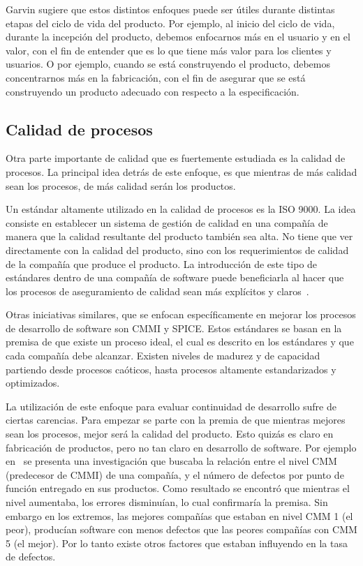 Garvin sugiere que estos distintos enfoques puede ser útiles durante distintas
etapas del ciclo de vida del producto. Por ejemplo, al inicio del ciclo de 
vida, durante la incepción del producto, debemos enfocarnos más en el usuario
y en el valor, con el fin de entender que es lo que tiene más valor para
los clientes y usuarios. O por ejemplo, cuando se está construyendo el producto,
debemos concentrarnos más en la fabricación, con el fin de asegurar que se está
construyendo un producto adecuado con respecto a la especificación.

\subsection{Calidad de procesos}
Otra parte importante de calidad que es fuertemente estudiada es la calidad de 
procesos. La principal idea detrás de este enfoque, es que mientras de más
calidad sean los procesos, de más calidad serán los productos.

Un estándar altamente utilizado en la calidad de procesos es la ISO 9000. La idea
consiste en establecer un sistema de gestión de calidad en una compañía de
manera que la calidad resultante del producto también sea alta. No tiene que ver
directamente con la calidad del producto, sino con los requerimientos de calidad
de la compañía que produce el producto. 
La introducción de este tipo de estándares dentro de una compañía de software
puede beneficiarla al hacer que los procesos de aseguramiento de calidad sean
más explícitos y claros~\cite{Wagner:2013}.

Otras iniciativas similares, que se enfocan específicamente en mejorar los
procesos de desarrollo de software son CMMI y SPICE.
Estos estándares se basan en la premisa de que existe un proceso ideal, 
el cual es descrito en los estándares y que cada compañía debe alcanzar.
Existen niveles de madurez y de capacidad partiendo desde procesos caóticos,
hasta procesos altamente estandarizados y optimizados.

La utilización de este enfoque para evaluar continuidad de desarrollo sufre
de ciertas carencias. Para empezar se parte con la premia de que mientras
mejores sean los procesos, mejor será la calidad del producto. Esto quizás
es claro en fabricación de productos, pero no tan claro en desarrollo de
software. Por ejemplo en~\cite{Jones:2000:SAB:335582} se presenta una 
investigación que buscaba la relación entre el nivel CMM (predecesor de CMMI) 
de una compañía, y el número de defectos por punto de función entregado en sus productos.
Como resultado se encontró que mientras el nivel aumentaba, los errores disminuían,
lo cual confirmaría la premisa. Sin embargo en los extremos, las mejores
compañías que estaban en nivel CMM 1 (el peor), producían software con menos
defectos que las peores compañías con CMM 5 (el mejor). Por lo tanto
existe otros factores que estaban influyendo en la tasa de defectos.

